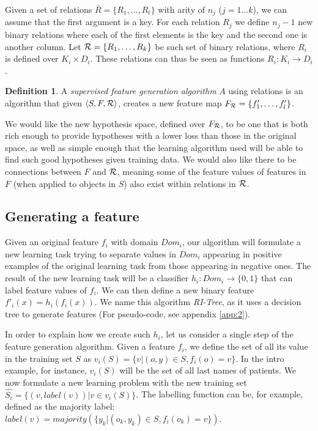 \documentclass{article}
\theoremstyle{definition}
\newtheorem{defn}{Definition}[section]
\begin{document}
Given a set of relations $\bar{R}=\{R_{1},\ldots,R_{t}\}$ with arity of $n_{j}$ ($j=1\ldots k$), we can assume  that the first argument is a key. For each relation $R_{j}$ we define $n_{j}-1$ new binary relations where each of the first elements is the key and the second one is another column.
Let ${\cal R}=\{R_{1},\ldots,R_{k}\}$ be such set of binary relations, where $R_{i}$ is defined over $K_{i}\times D_{i}$. These relations can thus be seen as functions $R_{i}: K_{i}\rightarrow D_{i}$.

\begin{defn}
	A \emph{supervised feature generation algorithm} $A$ using relations is an algorithm that given $\langle S,F,{\cal R} \rangle$, creates a new feature map $F_{\cal R}=\{f'_{1},\ldots,f'_{l}\}$.
\end{defn}

We would like the new hypothesis space, defined over $F_{\cal R}$, to be one that is both rich enough to provide hypotheses with a lower loss than those in the original space, as well as simple enough that the learning algorithm used will be able to find such good hypotheses given training data.
We would also like there to be connections between $F$ and ${\cal R}$, meaning some of the feature values of features in $F$ (when applied to objects in $S$) also exist within relations in $\cal R$.

\subsection{Generating a feature} \label{algorithm_section}

Given an original feature $f_{i}$ with domain $Dom_i$, our algorithm will formulate a new learning task trying to separate values in $Dom_i$ appearing in positive examples of the original learning task from those appearing in negative ones.  The result of the new learning task will be a classifier
$h_{i}:Dom_{i}\rightarrow \{0,1\}$ that can label feature values of $f_{i}$. We can then define a new binary feature $f'_{i}(x)=h_{i}(f_{i}(x))$.
We name this algorithm \emph{RI-Tree}, as it uses a decision tree to generate features (For pseudo-code, see appendix \ref{app:2}).

In order to explain how we create such $h_{i}$, let us consider a single step of the feature generation algorithm.
Given a feature $f_{i}$, we define the set of all its value in the training set $S$ as $v_i(S) = \{v | (o,y) \in S, f_{i}(o)=v\}$. In the intro example, for instance, $v_i(S)$ will be the set of all last names of patients.
We now formulate a new learning problem with the new training set
$\hat{S_i} = \{ (v, label(v)) | v \in v_i(S) \}$.
The labelling function can be, for example, defined as
the majority label: $label(v)=majority(\{y_k| \left(o_k,y_k \right) \in S, f_{i}(o_k)=v\})$.
\end{document}
